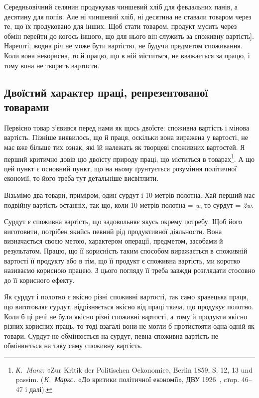 \parcont{}  %
Середньовічний селянин продукував чиншевий хліб для февдальних
панів, а десятину для попів. Але ні чиншевий хліб, ні десятина
не ставали товаром через те, що їх продуковано для інших.
Щоб стати товаром, продукт мусить через обмін перейти до когось
іншого, що для нього він служить за споживну вартість]. Нарешті,
жодна річ не може бути вартістю, не будучи предметом
споживання. Коли вона некорисна, то й працю, що в ній міститься,
не вважається за працю, і тому вона не творить вартости.

\subsection{Двоїстий характер праці, репрезентованої товарами
}

Первісно товар з’явився перед нами як щось двоїсте: споживна
вартість і мінова вартість. Пізніше виявилось, що й праця, оскільки
вона виражена у вартості, не має вже більше тих ознак,
які їй належать як творцеві споживних вартостей. Я перший
критично довів цю двоїсту природу праці, що міститься в товарах\footnote{
\emph{К.~Marx:} «Zur Kritik der Politischen Oekonomie», Berlin 1859,
S. 12, 13 und passim. (\emph{K.~Маркс.} «До критики політичної економії», ДВУ
1926~, cтop. 46--47 і далі).
}. А що цей пункт є основний пункт, що на ньому ґрунтується
розуміння політичної економії, то його треба тут детальніше
висвітлити.

Візьмімо два товари, приміром, один сурдут і 10 метрів полотна.
Хай перший має подвійну вартість останніх, так що, коли
10 метрів полотна = \emph{w}, то сурдут = \emph{2w}.

Сурдут є споживна вартість, що задовольняє якусь окрему
потребу. Щоб його виготовити, потрібен якийсь певний рід продуктивної
діяльности. Вона визначається своєю метою, характером
операції, предметом, засобами й результатом. Працю, що її
корисність таким способом виражається в споживній вартості її
продукту або в тім, що її продукт є споживна вартість, ми коротко
називаємо корисною працею. З цього погляду її треба завжди
розглядати стосовно до її корисного ефекту.

Як сурдут і полотно є якісно різні споживні вартості, так само
кравецька праця, що виготовляє сурдут, відрізняється якісно
від праці ткача, що продукує полотно. Коли б ці речі не були
якісно різні споживні вартості, а тому й продукти якісно різних
корисних праць, то тоді взагалі вони не могли б протистояти одна
одній як товари. Сурдут не обмінюється на сурдут, певна споживна
вартість не обмінюється на таку саму споживну вартість.

